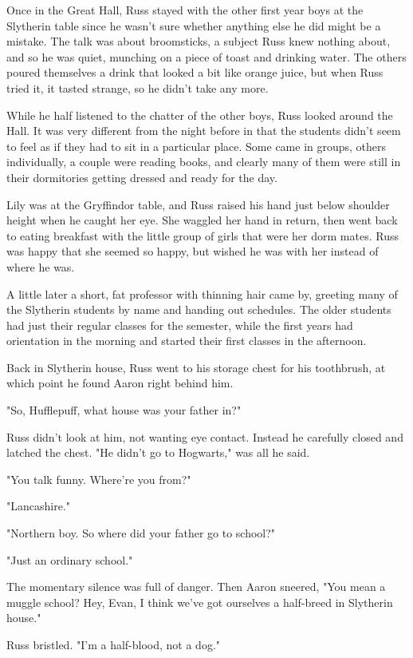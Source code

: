 Once in the Great Hall, Russ stayed with the other first year boys at the Slytherin table since he wasn't sure whether anything else he did might be a mistake. The talk was about broomsticks, a subject Russ knew nothing about, and so he was quiet, munching on a piece of toast and drinking water. The others poured themselves a drink that looked a bit like orange juice, but when Russ tried it, it tasted strange, so he didn't take any more.

While he half listened to the chatter of the other boys, Russ looked around the Hall. It was very different from the night before in that the students didn't seem to feel as if they had to sit in a particular place. Some came in groups, others individually, a couple were reading books, and clearly many of them were still in their dormitories getting dressed and ready for the day.

Lily was at the Gryffindor table, and Russ raised his hand just below shoulder height when he caught her eye. She waggled her hand in return, then went back to eating breakfast with the little group of girls that were her dorm mates. Russ was happy that she seemed so happy, but wished he was with her instead of where he was.

A little later a short, fat professor with thinning hair came by, greeting many of the Slytherin students by name and handing out schedules. The older students had just their regular classes for the semester, while the first years had orientation in the morning and started their first classes in the afternoon.

Back in Slytherin house, Russ went to his storage chest for his toothbrush, at which point he found Aaron right behind him.

"So, Hufflepuff, what house was your father in?"

Russ didn't look at him, not wanting eye contact. Instead he carefully closed and latched the chest. "He didn't{\el} go to Hogwarts," was all he said.

"You talk funny. Where're you from?"

"Lancashire."

"Northern boy. So where did your father go to school?"

"Just an{\el} ordinary school."

The momentary silence was full of danger. Then Aaron sneered, "You mean a muggle school? Hey, Evan, I think we've got ourselves a half-breed in Slytherin house."

Russ bristled. "I'm a{\el} half-blood, not a dog."

